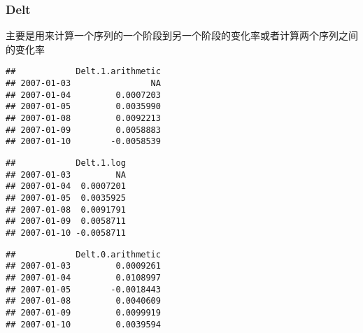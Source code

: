 \subsubsection{Delt}
主要是用来计算一个序列的一个阶段到另一个阶段的变化率或者计算两个序列之间的变化率
\begin{knitrout}
\color{fgcolor}\begin{kframe}
\begin{alltt}
\hlstd{(}\hlstd{(}  \hlstd{=} \hlstd{))} 
\end{alltt}
\begin{verbatim}
##            Delt.1.arithmetic
## 2007-01-03                NA
## 2007-01-04         0.0007203
## 2007-01-05         0.0035990
## 2007-01-08         0.0092213
## 2007-01-09         0.0058883
## 2007-01-10        -0.0058539
\end{verbatim}
\begin{alltt}
\hlstd{(}\hlstd{(}  \hlstd{= (}\hlstd{)))}
\end{alltt}
\begin{verbatim}
##            Delt.1.log
## 2007-01-03         NA
## 2007-01-04  0.0007201
## 2007-01-05  0.0035925
## 2007-01-08  0.0091791
## 2007-01-09  0.0058711
## 2007-01-10 -0.0058711
\end{verbatim}
\begin{alltt}
\hlstd{(}\hlstd{(} 
\end{alltt}
\begin{verbatim}
##            Delt.0.arithmetic
## 2007-01-03         0.0009261
## 2007-01-04         0.0108997
## 2007-01-05        -0.0018443
## 2007-01-08         0.0040609
## 2007-01-09         0.0099919
## 2007-01-10         0.0039594
\end{verbatim}
\end{kframe}
\end{knitrout}
